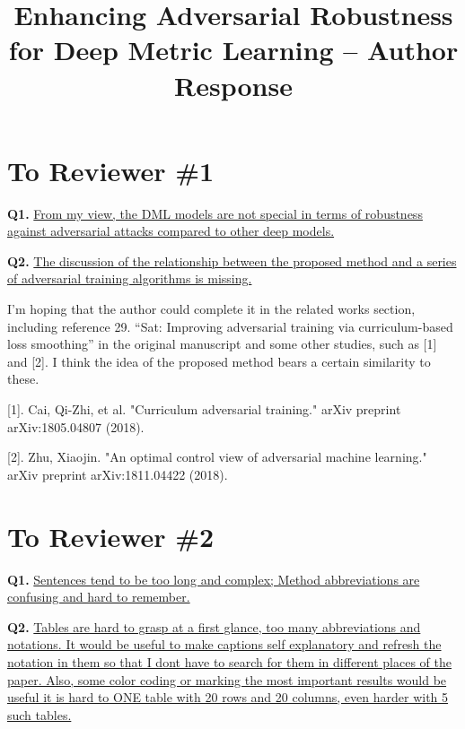 \documentclass[10pt,twocolumn,letterpaper]{article}
\begin{document}
\title{Enhancing Adversarial Robustness for Deep Metric Learning -- Author Response}  %

\maketitle
\thispagestyle{empty}
\appendix

\section*{To Reviewer \#1}

\noindent\textbf{Q1.}
%
\ul{
From my view, the DML models are not special in terms of robustness against
adversarial attacks compared to other deep models.
}

\noindent\textbf{Q2.}
%
\ul{
The discussion of the relationship between the proposed method and a series of
adversarial training algorithms is missing.
}

I’m hoping that the author could complete it in the related works section,
including reference 29. “Sat: Improving adversarial training via
curriculum-based loss smoothing” in the original manuscript and some other
studies, such as [1] and [2]. I think the idea of the proposed method bears a
certain similarity to these.

[1]. Cai, Qi-Zhi, et al. "Curriculum adversarial training." arXiv preprint arXiv:1805.04807 (2018).

[2]. Zhu, Xiaojin. "An optimal control view of adversarial machine learning." arXiv preprint arXiv:1811.04422 (2018).

\section*{To Reviewer \#2}

\noindent\textbf{Q1.}
%
\ul{
Sentences tend to be too long and complex; Method abbreviations are confusing
and hard to remember.
}

\noindent\textbf{Q2.}
%
\ul{
Tables are hard to grasp at a first glance, too many abbreviations and
notations. It would be useful to make captions self explanatory and refresh the
notation in them so that I dont have to search for them in different places of
the paper. Also, some color coding or marking the most important results would
be useful it is hard to ONE table with 20 rows and 20 columns, even harder with
5 such tables.
}
\end{document}
